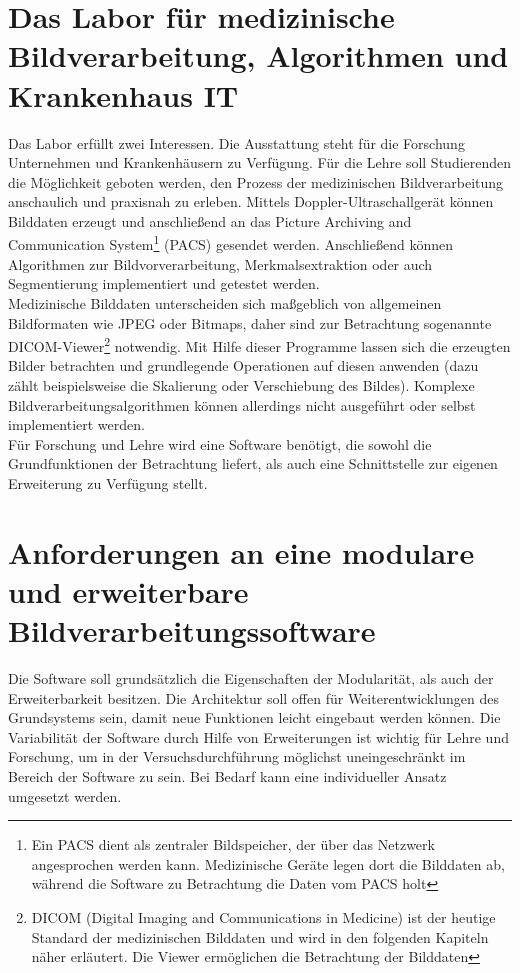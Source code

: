 \section{Das Labor für medizinische Bildverarbeitung, Algorithmen und Krankenhaus IT}
Das Labor erfüllt zwei Interessen. Die Ausstattung steht für die Forschung Unternehmen und Krankenhäusern zu Verfügung.
Für die Lehre soll Studierenden die Möglichkeit geboten werden, den Prozess der medizinischen Bildverarbeitung anschaulich und praxisnah zu erleben. Mittels Doppler-Ultraschallgerät können Bilddaten erzeugt und anschließend an das Picture Archiving and Communication System\footnote{Ein PACS dient als zentraler Bildspeicher, der über das Netzwerk angesprochen werden kann. Medizinische Geräte legen dort die Bilddaten ab, während die Software zu Betrachtung die Daten vom PACS holt} (PACS) gesendet werden. Anschließend können Algorithmen zur Bildvorverarbeitung, Merkmalsextraktion oder auch Segmentierung implementiert und getestet werden.\\
Medizinische Bilddaten unterscheiden sich maßgeblich von allgemeinen Bildformaten wie JPEG oder Bitmaps, daher sind zur Betrachtung sogenannte DICOM-Viewer\footnote{DICOM (Digital Imaging and Communications in Medicine) ist der heutige Standard der medizinischen Bilddaten und wird in den folgenden Kapiteln näher erläutert. Die Viewer ermöglichen die Betrachtung der Bilddaten} notwendig. Mit Hilfe dieser Programme lassen sich die erzeugten Bilder betrachten und grundlegende Operationen auf diesen anwenden (dazu zählt beispielsweise die Skalierung oder Verschiebung des Bildes). Komplexe Bildverarbeitungsalgorithmen können allerdings nicht ausgeführt oder selbst implementiert werden.\\
Für Forschung und Lehre wird eine Software benötigt, die sowohl die Grundfunktionen der Betrachtung liefert, als auch eine Schnittstelle zur eigenen Erweiterung zu Verfügung stellt.

\section{Anforderungen an eine modulare und erweiterbare Bildverarbeitungssoftware}

Die Software soll grundsätzlich die Eigenschaften der Modularität, als auch der Erweiterbarkeit besitzen. Die Architektur soll offen für Weiterentwicklungen des Grundsystems sein, damit neue Funktionen leicht eingebaut werden können. Die Variabilität der Software durch Hilfe von Erweiterungen ist wichtig für Lehre und Forschung, um in der Versuchsdurchführung möglichst uneingeschränkt im Bereich der Software zu sein. Bei Bedarf kann eine individueller Ansatz umgesetzt werden.\\
       
